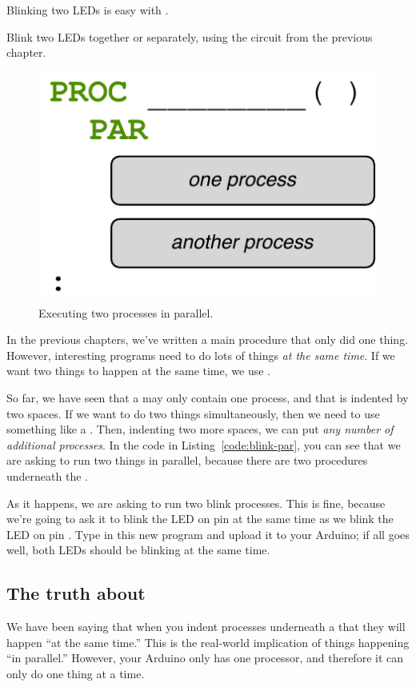 Blinking two LEDs is easy with \plumbing.

\GOALS
Blink two LEDs together or separately, using the circuit from the previous chapter.

\CODE


\PATTERNS

\begin{figure}[h]
  \begin{center}
    \includegraphics[width=0.6\linewidth]{images/ch3-pattern-par}
    \caption{Executing two processes in parallel.}
    \label{pattern:ch3-pattern-par}
  \end{center}
\end{figure}

In the previous chapters, we've written a {\procname main} procedure that only did one thing. However, interesting programs need to do lots of things {\em at the same time}. If we want two things to happen at the same time, we use \PAR.

So far, we have seen that a \PROC may only contain one process, and that is indented by two spaces. If we want to do two things simultaneously, then we need to use something like a \PAR. Then, indenting two more spaces, we can put {\em any number of additional processes}. In the code in Listing~\vref{code:blink-par}, you can see that we are asking \plumbing to run two things in parallel, because there are two procedures underneath the \PAR.

As it happens, we are asking \plumbing to run two {\procname blink} processes. This is fine, because we're going to ask it to blink the LED on pin {} at the same time as we blink the LED on pin {}. Type in this new program and upload it to your Arduino; if all goes well, both LEDs should be blinking at the same time.

\subsection{The truth about \PAR}
We have been saying that when you indent processes underneath a \PAR that they will happen ``at the same time.'' This is the real-world implication of things happening ``in parallel.'' However, your Arduino only has one processor, and therefore it can only do one thing at a time.

